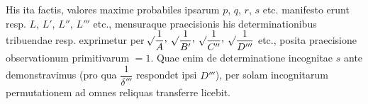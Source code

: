 His ita factis, valores maxime probabiles ipsarum $p$, $q$, $r$, $s$ etc.
manifesto erunt resp. $L$, $L'$, $L''$, $L'''$ etc., mensuraque praecisionis
his determinationibus tribuendae resp. exprimetur per
$\BareRoot{\dfrac{1}{A}}\mathpunct{\raisebox{.45ex}{,}}$
$\BareRoot{\dfrac{1}{B'}}\mathpunct{\raisebox{.45ex}{,}}$
$\BareRoot{\dfrac{1}{C''}}\mathpunct{\raisebox{.45ex}{,}}$
$\mathord{{}^{}\!\surd}\dfrac{1}{D'''}$ etc., posita praecisione observationum
primitivarum $=1$. Quae enim de determinatione incognitae $s$ ante
demonstravimus (pro qua $\dfrac{1}{\delta'''}$ respondet ipsi $D'''$),
per solam incognitarum permutationem ad omnes reliquas transferre licebit.%
